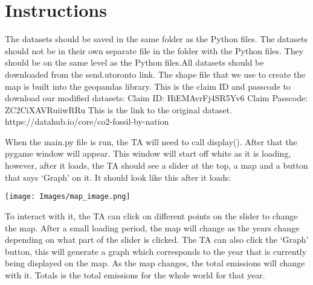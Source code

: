 \documentclass[fontsize=11pt]{article}
\begin{document}
\section*{Instructions}
The datasets should be saved in the same folder as the Python files. The datasets should not be in their own separate file in the folder with the Python files. They should be on the same level as the Python files.All datasets should be downloaded from the send.utoronto link. The shape file that we use to create the map is built into the geopandas library.
This is the claim ID and passcode to download our modified datasets:
Claim ID: HiEMAvrFj4SR5Yv6
Claim Passcode: ZC2CiXAVRuiiwRRu
This is the link to the original dataset.
https://datahub.io/core/co2-fossil-by-nation 
 
When the main.py file is run, the TA will need to call display(). After that the pygame window will appear. This window will start off white as it is loading, however, after it loads, the TA should see a slider at the top, a map and a button that says ‘Graph’ on it.  It should look like this after it loads:

\begin{center}
    \texttt{[image: Images/map\_image.png]}
\end{center}
To interact with it, the TA can click on different points on the slider to change the map. After a small loading period, the map will change as the years change depending on what part of the slider is clicked. The TA can also click the ‘Graph’ button, this will generate a graph which corresponds to the year that is currently being displayed on the map. As the map changes, the total emissions will change with it. Totals is the total emissions for the whole world for that year.
\end{document}
